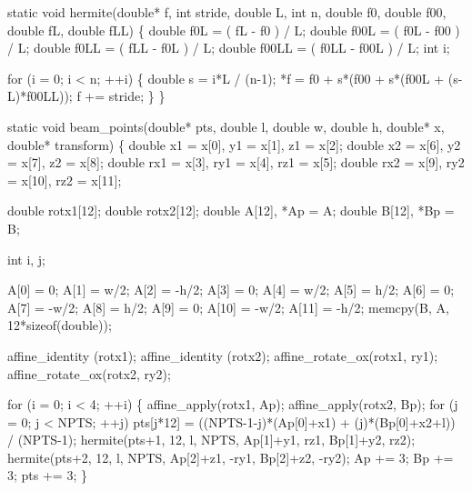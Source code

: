 \nwendcode{}\nwdocspar

\nwenddocs{}\plusendmoddef
static void hermite(double* f, int stride, double L, int n,
                    double f0, double f00, double fL, double fLL)
\{
    double f0L   = ( fL   - f0   ) / L;
    double f00L  = ( f0L  - f00  ) / L;
    double f0LL  = ( fLL  - f0L  ) / L;
    double f00LL = ( f0LL - f00L ) / L;
    int i;

    for (i = 0; i < n; ++i) \{
        double s = i*L / (n-1);
        *f = f0 + s*(f00 + s*(f00L + (s-L)*f00LL));
        f += stride;
    \}
\}

\nwendcode{}\nwdocspar

\nwenddocs{}\plusendmoddef
static void beam_points(double* pts, double l, double w, double h, 
                        double* x, double* transform)
\{
    double x1  = x[0], y1  = x[1],  z1  = x[2];
    double x2  = x[6], y2  = x[7],  z2  = x[8];
    double rx1 = x[3], ry1 = x[4],  rz1 = x[5];
    double rx2 = x[9], ry2 = x[10], rz2 = x[11];

    double rotx1[12];
    double rotx2[12];
    double A[12], *Ap = A;
    double B[12], *Bp = B;

    int i, j;

    A[0] = 0; A[1]  =  w/2;  A[2]  = -h/2;
    A[3] = 0; A[4]  =  w/2;  A[5]  =  h/2;
    A[6] = 0; A[7]  = -w/2;  A[8]  =  h/2;
    A[9] = 0; A[10] = -w/2;  A[11] = -h/2;
    memcpy(B, A, 12*sizeof(double));

    affine_identity (rotx1);
    affine_identity (rotx2);
    affine_rotate_ox(rotx1, ry1);
    affine_rotate_ox(rotx2, ry2);

    for (i = 0; i < 4; ++i) \{
        affine_apply(rotx1, Ap);
        affine_apply(rotx2, Bp);
        for (j = 0; j < NPTS; ++j) 
            pts[j*12] = ((NPTS-1-j)*(Ap[0]+x1) + (j)*(Bp[0]+x2+l)) / (NPTS-1);
        hermite(pts+1, 12, l, NPTS,  Ap[1]+y1,  rz1, Bp[1]+y2,    rz2);
        hermite(pts+2, 12, l, NPTS,  Ap[2]+z1, -ry1, Bp[2]+z2,   -ry2);
        Ap  += 3;
        Bp  += 3;
        pts += 3;
    \}

